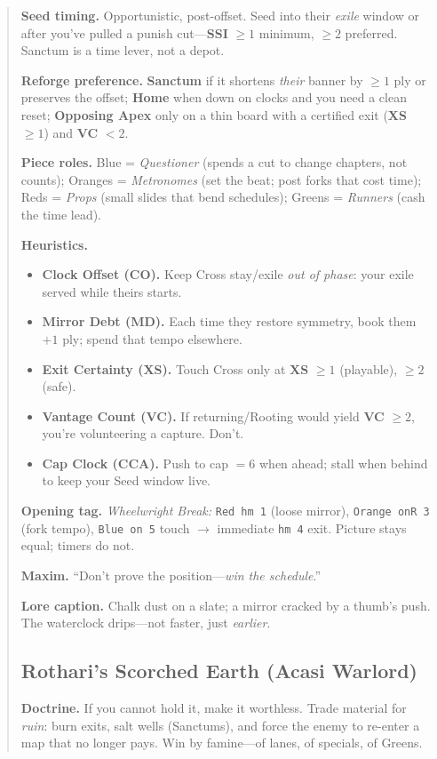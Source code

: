 \documentclass[11pt]{article}
\begin{document}
\begin{quote}
\medskip
\noindent\textbf{Seed timing.} Opportunistic, post-offset. Seed into their \emph{exile} window or after you’ve pulled a punish cut---\textbf{SSI} $\ge 1$ minimum, $\ge 2$ preferred. Sanctum is a time lever, not a depot.

\medskip
\noindent\textbf{Reforge preference.} \textbf{Sanctum} if it shortens \emph{their} banner by $\ge 1$ ply or preserves the offset; \textbf{Home} when down on clocks and you need a clean reset; \textbf{Opposing Apex} only on a thin board with a certified exit (\textbf{XS} $\ge 1$) and \textbf{VC} $< 2$.

\medskip
\noindent\textbf{Piece roles.} Blue = \emph{Questioner} (spends a cut to change chapters, not counts); Oranges = \emph{Metronomes} (set the beat; post forks that cost time); Reds = \emph{Props} (small slides that bend schedules); Greens = \emph{Runners} (cash the time lead).

\medskip
\noindent\textbf{Heuristics.}
\begin{itemize}[leftmargin=1.3em,itemsep=0.2em]
  \item \textbf{Clock Offset (CO).} Keep Cross stay/exile \emph{out of phase}: your exile served while theirs starts.
  \item \textbf{Mirror Debt (MD).} Each time they restore symmetry, book them $+1$ ply; spend that tempo elsewhere.
  \item \textbf{Exit Certainty (XS).} Touch Cross only at \textbf{XS} $\ge 1$ (playable), $\ge 2$ (safe).
  \item \textbf{Vantage Count (VC).} If returning/Rooting would yield \textbf{VC} $\ge 2$, you’re volunteering a capture. Don’t.
  \item \textbf{Cap Clock (CCA).} Push to cap $=6$ when ahead; stall when behind to keep your Seed window live.
\end{itemize}

\medskip
\noindent\textbf{Opening tag.} \emph{Wheelwright Break:} \texttt{Red hm 1} (loose mirror), \texttt{Orange onR 3} (fork tempo), \texttt{Blue on 5} touch $\rightarrow$ immediate \texttt{hm 4} exit. Picture stays equal; timers do not.

\medskip
\noindent\textbf{Maxim.} ``Don’t prove the position---\emph{win the schedule}.''

\medskip
\noindent\textbf{Lore caption.} Chalk dust on a slate; a mirror cracked by a thumb’s push. The waterclock drips---not faster, just \emph{earlier}.
\clearpage
\subsection{Rothari’s Scorched Earth (Acasi Warlord)}
\noindent\textbf{Doctrine.} If you cannot hold it, make it worthless. Trade material for \emph{ruin}: burn exits, salt wells (Sanctums), and force the enemy to re-enter a map that no longer pays. Win by famine—of lanes, of specials, of Greens.\\


\end{quote}
\end{document}
